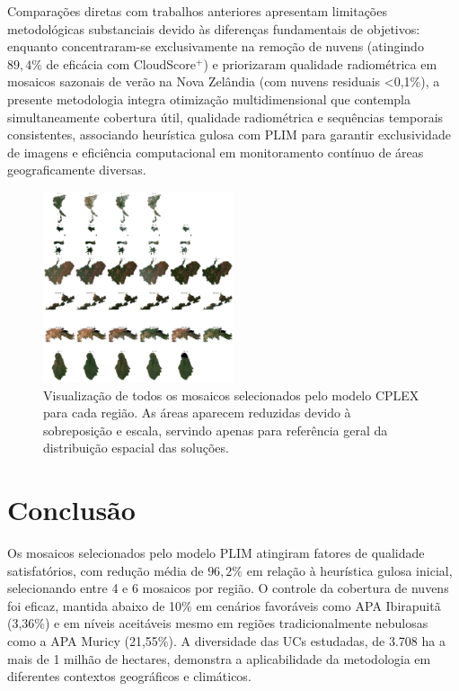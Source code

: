 \documentclass[a4paper,11pt]{article}
\begin{document}
Comparações diretas com trabalhos anteriores apresentam limitações metodológicas substanciais devido às diferenças fundamentais de objetivos: enquanto \citet{rodriguez-puerta:2024} concentraram-se exclusivamente na remoção de nuvens (atingindo $89,4\%$ de eficácia com CloudScore$^{+}$) e \citet{shepherd2020automated} priorizaram qualidade radiométrica em mosaicos sazonais de verão na Nova Zelândia (com nuvens residuais <0,1\%), a presente metodologia integra otimização multidimensional que contempla simultaneamente cobertura útil, qualidade radiométrica e sequências temporais consistentes, associando heurística gulosa com PLIM para garantir exclusividade de imagens e eficiência computacional em monitoramento contínuo de áreas geograficamente diversas.
\vspace{-2mm}
\begin{figure}[H]
    \centering
    \includegraphics[width=0.5\textwidth]{img/all_selection.jpg}
    \caption{Visualização de todos os mosaicos selecionados pelo modelo CPLEX para cada região. As áreas aparecem reduzidas devido à sobreposição e escala, servindo apenas para referência geral da distribuição espacial das soluções.}
    \label{fig:all_outputs}
\end{figure}
\vspace{-2mm}

\vspace{-8mm}
\section{Conclusão}
\vspace{-4mm}
Os mosaicos selecionados pelo modelo PLIM atingiram fatores de qualidade satisfatórios, com redução média de $96,2\%$ em relação à heurística gulosa inicial, selecionando entre 4 e 6 mosaicos por região. O controle da cobertura de nuvens foi eficaz, mantida abaixo de 10\% em cenários favoráveis como APA Ibirapuitã (3,36\%) e em níveis aceitáveis mesmo em regiões tradicionalmente nebulosas como a APA Muricy (21,55\%). A diversidade das UCs estudadas, de 3.708 ha a mais de 1 milhão de hectares, demonstra a aplicabilidade da metodologia em diferentes contextos geográficos e climáticos.
\end{document}
